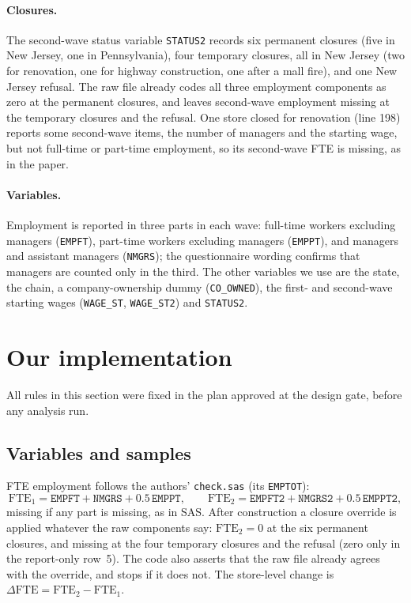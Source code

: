 \documentclass[11pt]{article}
\newcommand{\var}[1]{\texttt{#1}}
\begin{document}
\paragraph{Closures.} The second-wave status variable \var{STATUS2} records six permanent
closures (five in New Jersey, one in Pennsylvania), four temporary closures, all in New
Jersey (two for renovation, one for highway construction, one after a mall fire), and one
New Jersey refusal. The raw file already codes all three employment components as zero at
the permanent closures, and leaves second-wave employment missing at the temporary closures
and the refusal. One store closed for renovation (line 198) reports some second-wave items,
the number of managers and the starting wage, but not full-time or part-time employment, so
its second-wave FTE is missing, as in the paper.

\paragraph{Variables.} Employment is reported in three parts in each wave: full-time
workers excluding managers (\var{EMPFT}), part-time workers excluding managers
(\var{EMPPT}), and managers and assistant managers (\var{NMGRS}); the questionnaire wording
confirms that managers are counted only in the third. The other variables we use are the
state, the chain, a company-ownership dummy (\var{CO\_OWNED}), the first- and second-wave
starting wages (\var{WAGE\_ST}, \var{WAGE\_ST2}) and \var{STATUS2}.

\section{Our implementation}
\label{sec:impl}

All rules in this section were fixed in the plan approved at the design gate, before any
analysis run.

\subsection{Variables and samples}

FTE employment follows the authors' \texttt{check.sas} (its \var{EMPTOT}):
\begin{equation*}
  \text{FTE}_1 = \var{EMPFT} + \var{NMGRS} + 0.5\,\var{EMPPT}, \qquad
  \text{FTE}_2 = \var{EMPFT2} + \var{NMGRS2} + 0.5\,\var{EMPPT2},
\end{equation*}
missing if any part is missing, as in SAS. After construction a closure override is applied
whatever the raw components say: $\text{FTE}_2 = 0$ at the six permanent closures, and
missing at the four temporary closures and the refusal (zero only in the report-only row~5).
The code also asserts that the raw file already agrees with the override, and stops if it
does not. The store-level change is $\Delta\text{FTE} = \text{FTE}_2 - \text{FTE}_1$.
\end{document}
